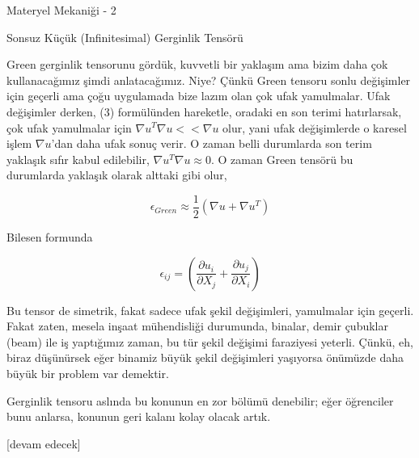 \documentclass[12pt,fleqn]{article}\usepackage{../../common}
\begin{document}
Materyel Mekaniği - 2

Sonsuz Küçük (Infinitesimal) Gerginlik Tensörü

Green gerginlik tensorunu gördük, kuvvetli bir yaklaşım ama bizim daha çok
kullanacağımız şimdi anlatacağımız. Niye? Çünkü Green tensoru sonlu değişimler
için geçerli ama çoğu uygulamada bize lazım olan çok ufak yamulmalar. Ufak
değişimler derken, (3) formülünden hareketle, oradaki en son terimi hatırlarsak,
çok ufak yamulmalar için $\nabla u^T \nabla u << \nabla u$ olur, yani ufak
değişimlerde o karesel işlem $\nabla u$'dan daha ufak sonuç verir. O zaman belli
durumlarda son terim yaklaşık sıfır kabul edilebilir, $\nabla u^T \nabla u
\approx 0$. O zaman Green tensörü bu durumlarda yaklaşık olarak alttaki gibi
olur,

$$
\epsilon_{Green} \approx \frac{1}{2} (\nabla u + \nabla u^T )
$$

Bilesen formunda

$$
\epsilon_{ij} = \left(
\frac{\partial u_i}{\partial X_j} + \frac{\partial u_j}{\partial X_i}
\right)
$$

Bu tensor de simetrik, fakat sadece ufak şekil değişimleri, yamulmalar için
geçerli. Fakat zaten, mesela inşaat mühendisliği durumunda, binalar, demir
çubuklar (beam) ile iş yaptığımız zaman, bu tür şekil değişimi faraziyesi
yeterli. Çünkü, eh, biraz düşünürsek eğer binamiz büyük şekil değişimleri
yaşıyorsa önümüzde daha büyük bir problem var demektir. 

Gerginlik tensoru aslında bu konunun en zor bölümü denebilir; eğer öğrenciler
bunu anlarsa, konunun geri kalanı kolay olacak artık.





[devam edecek]
\end{document}
